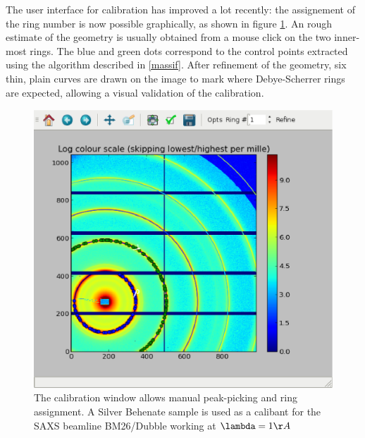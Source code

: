 \documentclass[preprint]{iucr}
\begin{document}
The user interface for calibration has improved a lot recently: the assignement
of the ring number is now possible graphically, as shown in figure \ref{calib}.
An rough estimate of the geometry is usually obtained from a mouse click on the
two inner-most rings. 
The blue and green dots correspond to the control points extracted using the
algorithm described in \ref{massif}. 
After refinement of the geometry, six thin, plain curves are drawn on the
image to mark where Debye-Scherrer rings are expected, allowing a visual
validation of the calibration.

\begin{figure}
\label{calib}
\begin{center}
\includegraphics[width=15cm]{calib.eps}
\caption{The calibration window allows manual peak-picking and
ring assignment. A Silver Behenate sample is used as a calibant for the SAXS
beamline BM26/Dubble working at $\lambda=1\AA$ }
\end{center}
\end{figure}
\end{document}
